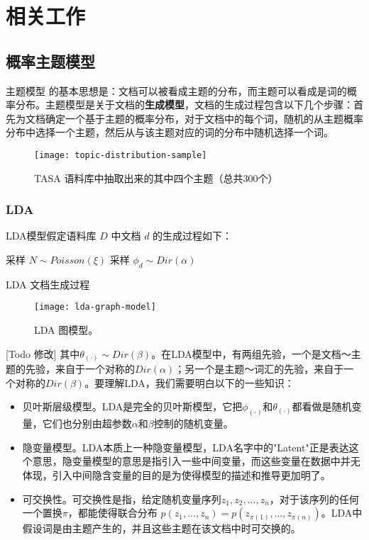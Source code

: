 \chapter{相关工作}

\section{概率主题模型}
主题模型 \cite{griffiths2004finding, Blei:2003, hofmann1999probabilistic, hofmann2001unsupervised} 的基本思想是：文档可以被看成主题的分布，而主题可以看成是词的概率分布。主题模型是关于文档的\textbf{生成模型}，文档的生成过程包含以下几个步骤：首先为文档确定一个基于主题的概率分布，对于文档中的每个词，随机的从主题概率分布中选择一个主题，然后从与该主题对应的词的分布中随机选择一个词。
\begin{figure}[!htb]
	\centering
		\texttt{[image: topic-distribution-sample]}
	\caption{TASA 语料库中抽取出来的其中四个主题（总共300个）}
	\label{fig:topic-distribution-sample}
\end{figure}

\subsection{LDA}
\label{intro-lda}
LDA\cite{Blei:2003}模型假定语料库 $D$ 中文档 $d$ 的生成过程如下：\\
\begin{algorithm}[H]
  采样 $N \sim Poisson(\xi)$\;
  采样 $\phi_d \sim Dir(\alpha)$\;
  \caption{LDA 文档生成过程}
  \label{lda-generative-process}
\end{algorithm}
\begin{figure}[!htb]
	\centering
		\texttt{[image: lda-graph-model]}
	\caption{LDA 图模型。}
	\label{fig:lda-graph-model}
\end{figure}
[Todo 修改]
其中$\theta_{(\cdot)} \sim Dir(\beta)$。在LDA模型中，有两组先验，一个是文档～主题的先验，来自于一个对称的$Dir(\alpha)$；另一个是主题～词汇的先验，来自于一个对称的$Dir(\beta)$。要理解LDA，我们需要明白以下的一些知识：
\begin{itemize}
\item 贝叶斯层级模型。LDA是完全的贝叶斯模型，它把$\phi_{(\cdot)}$和$\theta_{(\cdot)}$都看做是随机变量，它们也分别由超参数$\alpha$和$\beta$控制的随机变量。
\item 隐变量模型。LDA本质上一种隐变量模型，LDA名字中的"Latent"正是表达这个意思，隐变量模型的意思是指引入一些中间变量，而这些变量在数据中并无体现，引入中间隐含变量的目的是为使得模型的描述和推导更加明了。
\item 可交换性。可交换性是指，给定随机变量序列${z_1, z_2, ... , z_n}$，对于该序列的任何一个置换$\pi$，都能使得联合分布 $p(z_1, ..., z_n)=p(z_{\pi(1)}, ..., z_{\pi(n)})$。LDA中假设词是由主题产生的，并且这些主题在该文档中时可交换的。
\end{itemize}

